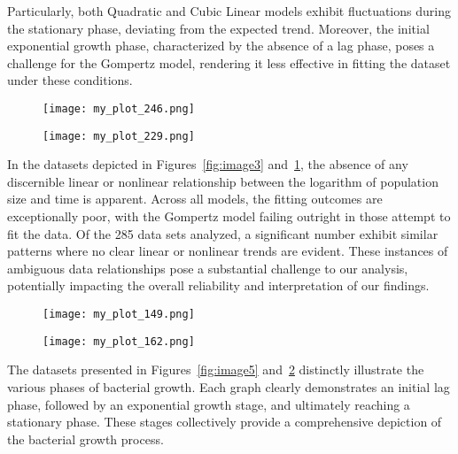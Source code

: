 \documentclass[11pt]{article}
\begin{document}
Particularly, both Quadratic and Cubic Linear models exhibit fluctuations during the stationary phase, deviating from the expected trend. Moreover, the initial exponential growth phase, characterized by the absence of a lag phase, poses a challenge for the Gompertz model, rendering it less effective in fitting the dataset under these conditions. 
\begin{figure}[H]
  \centering
  \begin{minipage}{0.48\textwidth}
    \texttt{[image: my\_plot\_246.png]}
    \caption{}
    \label{fig:image3}
  \end{minipage}
  \hfill
  \begin{minipage}{0.48\textwidth}
    \texttt{[image: my\_plot\_229.png]}
    \caption{}
    \label{fig:image4}
  \end{minipage}
\end{figure}
In the datasets depicted in Figures~\ref{fig:image3} and~\ref{fig:image4}, the absence of any discernible linear or nonlinear relationship between the logarithm of population size and time is apparent. Across all models, the fitting outcomes are exceptionally poor, with the Gompertz model failing outright in those attempt to fit the data.
Of the 285 data sets analyzed, a significant number exhibit similar patterns where no clear linear or nonlinear trends are evident. These instances of ambiguous data relationships pose a substantial challenge to our analysis, potentially impacting the overall reliability and interpretation of our findings.

\begin{figure}[H]
  \centering
  \begin{minipage}{0.48\textwidth}
    \texttt{[image: my\_plot\_149.png]}
    \caption{}
    \label{fig:image5}
  \end{minipage}
  \hfill
  \begin{minipage}{0.48\textwidth}
    \texttt{[image: my\_plot\_162.png]}
    \caption{}
    \label{fig:image6}
  \end{minipage}
\end{figure}
\vspace{12pt} 
The datasets presented in Figures~\ref{fig:image5} and~\ref{fig:image6} distinctly illustrate the various phases of bacterial growth. Each graph clearly demonstrates an initial lag phase, followed by an exponential growth stage, and ultimately reaching a stationary phase. These stages collectively provide a comprehensive depiction of the bacterial growth process.
\end{document}
